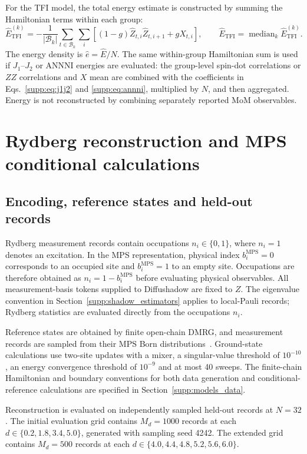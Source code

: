 \documentclass[11pt,a4paper]{article}
\newcommand{\TBD}[1]{\textcolor{red!70!black}{\textsf{[TBD: #1]}}}
\newcommand{\sechead}[2]{\section{#2}}
\newcommand{\subhead}[1]{\subsection*{#1}}
\begin{document}
For the TFI model, the total energy estimate is constructed by summing
the Hamiltonian terms within each group:
\begin{equation}
\widehat{E}^{(k)}_{\mathrm{TFI}}
=-\frac{1}{|\mathcal{B}_k|}\sum_{t\in\mathcal{B}_k}\sum_i
\left[(1-g)\widehat{Z}_{t,i}\widehat{Z}_{t,i+1}
+g\widehat{X}_{t,i}\right],
\qquad
\widehat{E}_{\mathrm{TFI}}=\operatorname{median}_k
\widehat{E}^{(k)}_{\mathrm{TFI}}.
\label{supp:eq:tfi_energy}
\end{equation}
The energy density is $\widehat{e}=\widehat{E}/N$. The same within-group Hamiltonian sum is used if $J_1$--$J_2$ or ANNNI
energies are evaluated: the group-level spin-dot correlations or $ZZ$
correlations and $X$ mean are combined with the coefficients in
Eqs.~\eqref{supp:eq:j1j2} and \eqref{supp:eq:annni}, multiplied by $N$,
and then aggregated. Energy is not reconstructed by combining separately
reported MoM observables.

\sechead{S4}{Rydberg reconstruction and MPS conditional calculations}
\label{supp:rydberg}

\subhead{Encoding, reference states and held-out records}
Rydberg measurement records contain occupations $n_i\in\{0,1\}$,
where $n_i=1$ denotes an excitation. In the MPS representation,
physical index $b_i^{\mathrm{MPS}}=0$ corresponds to an occupied site
and $b_i^{\mathrm{MPS}}=1$ to an empty site. Occupations are therefore
obtained as $n_i=1-b_i^{\mathrm{MPS}}$ before evaluating physical
observables. All measurement-basis tokens supplied to Diffushadow
are fixed to $Z$. The eigenvalue convention in Section~\ref{supp:shadow_estimators} applies
to local-Pauli records; Rydberg statistics are evaluated directly
from the occupations $n_i$.

Reference states are obtained by finite open-chain DMRG, and
measurement records are sampled from their MPS Born
distributions~\cite{schollwock2011density,ferris2012perfect}.
Ground-state calculations use two-site updates with a mixer,
a singular-value threshold of $10^{-10}$, an energy convergence
threshold of $10^{-9}$ and at most 40 sweeps.
The finite-chain Hamiltonian and boundary conventions for both
data generation and conditional-reference calculations are specified
in Section~\ref{supp:models_data}. 

Reconstruction is evaluated on independently sampled held-out
records at $N=32$. The initial evaluation grid contains $M_d=1000$
records at each $d\in\{0.2,1.8,3.4,5.0\}$, generated with sampling
seed 4242. The extended grid contains $M_d=500$ records at each
$d\in\{4.0,4.4,4.8,5.2,5.6,6.0\}$.
\end{document}
